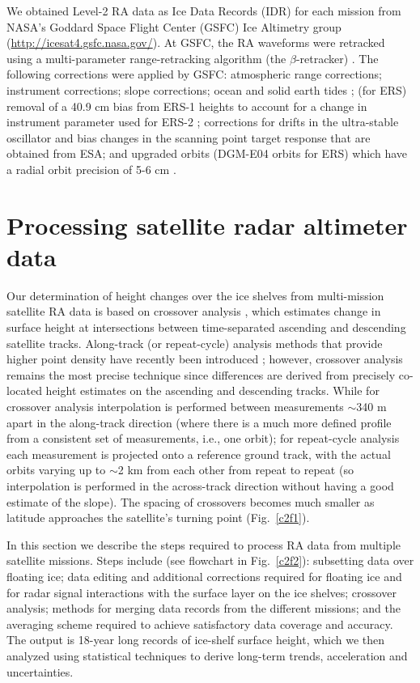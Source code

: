 We obtained Level-2 RA data as Ice Data Records (IDR) for each mission from NASA's Goddard Space Flight Center (GSFC) Ice Altimetry group (\url{http://icesat4.gsfc.nasa.gov/}). At GSFC, the RA waveforms were retracked using a multi-parameter range-retracking algorithm (the $\beta$-retracker) \parencite{Zwally2001}. The following corrections were applied by GSFC: atmospheric range corrections; instrument corrections; slope corrections; ocean and solid earth tides \parencite{Brenner1983, Zwally2001, Zwally2005}; (for ERS) removal of a 40.9 cm bias from ERS-1 heights to account for a change in instrument parameter used for ERS-2 \parencite{Femenias1996}; corrections for drifts in the ultra-stable oscillator and bias changes in the scanning point target response that are obtained from ESA; and upgraded orbits (DGM-E04 orbits for ERS) which have a radial orbit precision of 5-6 cm \parencite{Scharroo1998}.


\section{Processing satellite radar altimeter data}

\noindent
Our determination of height changes over the ice shelves from multi-mission satellite RA data is based on crossover analysis \parencite[e.g.,][]{Davis2004, Wingham2009, Zwally2005}, which estimates change in surface height at intersections between time-separated ascending and descending satellite tracks. Along-track (or repeat-cycle) analysis methods that provide higher point density have recently been introduced \parencite{Flament2012, Moholdt2010, Pritchard2012}; however, crossover analysis remains the most precise technique since differences are derived from precisely co-located height estimates on the ascending and descending tracks. While for crossover analysis interpolation is performed between measurements $\sim$340 m apart in the along-track direction (where there is a much more defined profile from a consistent set of measurements, i.e., one orbit); for repeat-cycle analysis each measurement is projected onto a reference ground track, with the actual orbits varying up to $\sim$2 km from each other from repeat to repeat (so interpolation is performed in the across-track direction without having a good estimate of the slope). The spacing of crossovers becomes much smaller as latitude approaches the satellite's turning point (Fig.~\ref{c2f1}).

In this section we describe the steps required to process RA data from multiple satellite missions. Steps include (see flowchart in Fig.~\ref{c2f2}): subsetting data over floating ice; data editing and additional corrections required for floating ice and for radar signal interactions with the surface layer on the ice shelves; crossover analysis; methods for merging data records from the different missions; and the averaging scheme required to achieve satisfactory data coverage and accuracy. The output is 18-year long records of ice-shelf surface height, which we then analyzed using statistical techniques to derive long-term trends, acceleration and uncertainties.


